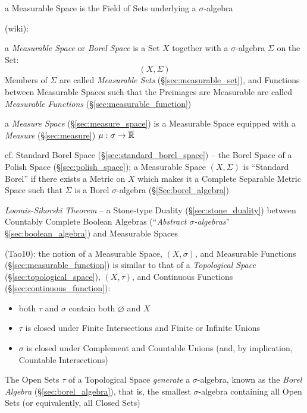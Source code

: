 a Measurable Space is the Field of Sets underlying a $\sigma$-algebra

(wiki):

a \emph{Measurable Space} or \emph{Borel Space} is a Set $X$ together with a
$\sigma$-algebra $\Sigma$ on the Set:
\[
  (X,\Sigma)
\]
Members of $\Sigma$ are called \emph{Measurable Sets}
(\S\ref{sec:measurable_set}), and Functions between Measurable Spaces such that
the Preimages are Measurable are called \emph{Measurable Functions}
(\S\ref{sec:measurable_function})

\fist a \emph{Measure Space} (\S\ref{sec:measure_space}) is a Measurable Space
equipped with a \emph{Measure} (\S\ref{sec:measure})
$\mu : \sigma \rightarrow \overline{\mathbb{R}}$

\fist cf. Standard Borel Space (\S\ref{sec:standard_borel_space}) -- the Borel
Space of a Polish Space (\S\ref{sec:polish_space}); a Measurable Space $(X,
\Sigma)$ is ``Standard Borel'' if there exists a Metric on $X$ which makes it a
Complete Separable Metric Space such that $\Sigma$ is a Borel $\sigma$-algebra
(\S\ref{Sec:borel_algebra})

\emph{Loomis-Sikorski Theorem} -- a Stone-type Duality
(\S\ref{sec:stone_duality}) between Countably Complete Boolean Algebras
(``\emph{Abstract $\sigma$-algebras}'' \S\ref{sec:boolean_algebra}) and
Measurable Spaces

(Tao10): the notion of a Measurable Space, $(X,\sigma)$, and Measurable
Functions (\S\ref{sec:measurable_function}) is similar to that of a
\emph{Topological Space} (\S\ref{sec:topological_space}), $(X,\tau)$, and
Continuous Functions (\S\ref{sec:continuous_function}):
\begin{itemize}
  \item both $\tau$ and $\sigma$ contain both $\varnothing$ and $X$
  \item $\tau$ is closed under Finite Intersections and Finite or Infinite
    Unions
  \item $\sigma$ is closed under Complement and Countable Unions (and,
    by implication, Countable Intersections)
\end{itemize}
The Open Sets $\tau$ of a Topological Space \emph{generate} a $\sigma$-algebra,
known as the \emph{Borel Algebra} (\S\ref{sec:borel_algebra}), that is, the
smallest $\sigma$-algebra containing all Open Sets (or equivalently, all Closed
Sets)



